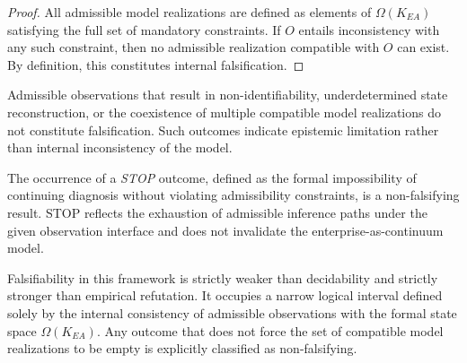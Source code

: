 \begin{proof}
All admissible model realizations are defined as elements of
\(\Omega(K_{EA})\) satisfying the full set of mandatory constraints.
If \(O\) entails inconsistency with any such constraint, then no admissible
realization compatible with \(O\) can exist.
By definition, this constitutes internal falsification.
\end{proof}

\medskip

\begin{proposition}
\label{prop:nonfalsifying}
Admissible observations that result in non-identifiability, underdetermined
state reconstruction, or the coexistence of multiple compatible model
realizations do not constitute falsification.
Such outcomes indicate epistemic limitation rather than internal
inconsistency of the model.
\end{proposition}

\medskip

\begin{proposition}
\label{prop:stop-not-falsification}
The occurrence of a \emph{STOP} outcome, defined as the formal impossibility
of continuing diagnosis without violating admissibility constraints, is a
non-falsifying result.
STOP reflects the exhaustion of admissible inference paths under the given
observation interface and does not invalidate the
enterprise-as-continuum model.
\end{proposition}

\medskip

\begin{remark}
Falsifiability in this framework is strictly weaker than decidability and
strictly stronger than empirical refutation.
It occupies a narrow logical interval defined solely by the internal
consistency of admissible observations with the formal state space
\(\Omega(K_{EA})\).
Any outcome that does not force the set of compatible model realizations to
be empty is explicitly classified as non-falsifying.
\end{remark}
